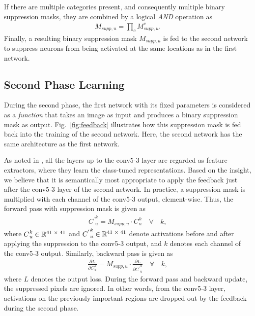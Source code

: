 \documentclass[10pt,twocolumn,letterpaper]{article}
\newcommand{\figref}[1]{Fig.~\ref{#1}}
\begin{document}
If there are multiple categories present, and consequently multiple binary suppression masks, they are combined by a logical \textit{AND} operation as
\begin{eqnarray}
   M_{supp,u} =  \prod_{c} M_{supp,u}^{c}.
\label{eq:logicalAND}
\end{eqnarray}
Finally, a resulting binary suppression mask $M_{supp,u}$ is fed to the second network to suppress neurons from being activated at the same locations as in the first network.


\subsection{Second Phase Learning}
\label{sec:Second_phase}
During the second phase, the first network with its fixed parameters is considered as a \textit{function} that takes an image as input and produces a binary suppression mask as output. \figref{fig:feedback} illustrates how this suppression mask is fed back into the training of the second network. Here, the second network has the same architecture as the first network.

As noted in \cite{GirshickDDM14}, all the layers up to the conv5-3 layer are regarded as feature extractors, where they learn the class-tuned representations. %
Based on the insight, we believe that it is semantically most appropriate to apply the feedback just after the conv5-3 layer of the second network. In practice, a suppression mask is multiplied with each channel of the conv5-3 output, element-wise. %
Thus, the forward pass with suppression mask is given as
\begin{eqnarray}{C^{'}}_{u}^{k} = M_{supp,u} \cdot {C^{}}_{u}^{k} \quad \forall \quad{k},
   \label{eq:EltwiseForward}
\end{eqnarray}
where ${C^{}}_{u}^{k}\in \mathbb{R} \textsuperscript{41 $\times$ 41}$ and ${C^{'}}_{u}^{k}\in \mathbb{R} \textsuperscript{41 $\times$ 41}$ denote activations before and after applying the suppression to the conv5-3 output, and $k$ denotes each channel of the conv5-3 output. Similarly, backward pass is given as
\begin{eqnarray}
   \frac{\partial L}{\partial {C^{}}_{u}^{k}} = M_{supp,u} \cdot \frac{\partial L}{\partial {C^{'}}_{u}^{k}} \quad \forall \quad{k},
   \label{eq:EltwiseBackward}
\end{eqnarray}
where $L$ denotes the output loss.
During the forward pass and backward update, the suppressed pixels are ignored. In other words, from the conv5-3 layer, activations on the previously important regions are dropped out by the feedback during the second phase.
\end{document}
